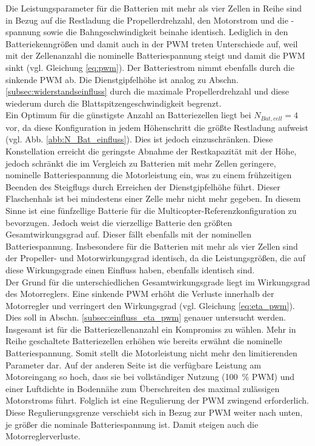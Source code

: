 Die Leistungsparameter für die Batterien mit mehr als vier Zellen in Reihe sind in Bezug auf die Restladung die Propellerdrehzahl, den Motorstrom und die -spannung sowie die Bahngeschwindigkeit beinahe identisch. Lediglich in den Batteriekenngrößen und damit auch in der PWM treten Unterschiede auf, weil mit der Zellenanzahl die nominelle Batteriespannung steigt und damit die PWM sinkt (vgl. Gleichung \eqref{eq:pwm}). Der Batteriestrom nimmt ebenfalls durch die sinkende PWM ab. Die Dienstgipfelhöhe ist analog zu Abschn. \ref{subsec:widerstandseinfluss} durch die maximale Propellerdrehzahl und diese wiederum durch die Blattspitzengeschwindigkeit begrenzt. \\
Ein Optimum für die günstigste Anzahl an Batteriezellen liegt bei \ensuremath{N_{Bat,cell} = 4} vor, da diese Konfiguration in jedem Höhenschritt die größte Restladung aufweist (vgl. Abb. \ref{abb:N_Bat_einfluss}). Dies ist jedoch einzuschränken. Diese Konstellation erreicht die geringste Abnahme der Restkapazität mit der Höhe, jedoch schränkt die im Vergleich zu Batterien mit mehr Zellen geringere, nominelle Batteriespannung die Motorleistung ein, was zu einem frühzeitigen Beenden des Steigflugs durch Erreichen der Dienstgipfelhöhe führt. Dieser Flaschenhals ist bei mindestens einer Zelle mehr nicht mehr gegeben. In diesem Sinne ist eine fünfzellige Batterie für die Multicopter-Referenzkonfiguration zu bevorzugen. Jedoch weist die vierzellige Batterie den größten Gesamtwirkungsgrad auf. Dieser fällt ebenfalls mit der nominellen Batteriespannung. Insbesondere für die Batterien mit mehr als vier Zellen sind der Propeller- und Motorwirkungsgrad identisch, da die Leistungsgrößen, die auf diese Wirkungsgrade einen Einfluss haben, ebenfalls identisch sind. \\
Der Grund für die unterschiedlichen Gesamtwirkungsgrade liegt im Wirkungsgrad des Motorreglers. Eine sinkende PWM erhöht die Verluste innerhalb der Motorregler und verringert den Wirkungsgrad (vgl. Gleichung \eqref{eq:eta_pwm}). Dies soll in Abschn. \ref{subsec:einfluss_eta_pwm} genauer untersucht werden.\\
Insgesamt ist für die Batteriezellenanzahl ein Kompromiss zu wählen. 
Mehr in Reihe geschaltete Batteriezellen erhöhen wie bereits erwähnt die nominelle Batteriespannung. Somit stellt die Motorleistung nicht mehr den limitierenden Parameter dar. Auf der anderen Seite ist die verfügbare Leistung am Motoreingang so hoch, dass sie bei vollständiger Nutzung (\SI{100}{\%} PWM) und einer Luftdichte in Bodennähe zum Überschreiten des maximal zulässigen Motorstroms führt. Folglich ist eine Regulierung der PWM zwingend erforderlich. Diese Regulierungsgrenze verschiebt sich in Bezug zur PWM weiter nach unten, je größer die nominale Batteriespannung ist. Damit steigen auch die Motorreglerverluste.

